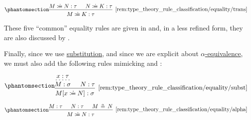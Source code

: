 \begin{remark}
\begin{thmenum}
\begin{paracol}{3}
      \begin{nthcolumn}{2}
        \ParacolAlignmentHack
        \begin{equation*}\taglabel[\ensuremath{ \coloneqq_{\logic{trans}} }]{rem:type_theory_rule_classification/equality/trans}
          \begin{prooftree}
            \hypo{ M \syndefeq N: \tau }
            \hypo{ N \syndefeq K: \tau }
            \infer2[\ref{rem:type_theory_rule_classification/equality/trans}]{ M \syndefeq K: \tau }
          \end{prooftree}
        \end{equation*}
      \end{nthcolumn}
    \end{paracol}
    \columnratio{}

    These five \enquote{common} equality rules are given in \cite[433]{UnivalentFoundationsProgram2013HoTT} and, in a less refined form, they are also discussed by .

    Finally, since we use \hyperref[def:lambda_term_substitution]{substitution}, and since we are explicit about \hyperref[def:lambda_term_alpha_equivalence]{\( \alpha \)-equivalence}, we must also add the following rules mimicking  and :
    \begin{paracol}{2}
      \begin{leftcolumn}
        \ParacolAlignmentHack
        \begin{equation*}\taglabel[\ensuremath{ \coloneqq_\mapsto }]{rem:type_theory_rule_classification/equality/subst}
          \begin{prooftree}
            \hypo{ x: \tau }
            \infer[dashed]1{ M: \sigma }

            \hypo{ N: \tau }
            \infer2[\ref{rem:type_theory_rule_classification/equality/subst}]{ M[x \syndefeq N]: \sigma }
          \end{prooftree}
        \end{equation*}
      \end{leftcolumn}

      \begin{rightcolumn}
        \ParacolAlignmentHack
        \begin{equation*}\taglabel[\ensuremath{ \coloneqq_\alpha }]{rem:type_theory_rule_classification/equality/alpha}
          \begin{prooftree}
            \hypo{ M: \tau }
            \hypo{ N: \tau }
            \hypo{ M \aequiv N }
            \infer3[\ref{rem:type_theory_rule_classification/equality/alpha}]{ M \syndefeq N: \tau }
          \end{prooftree}
        \end{equation*}
      \end{rightcolumn}
    \end{paracol}


\end{thmenum}
\end{remark}

